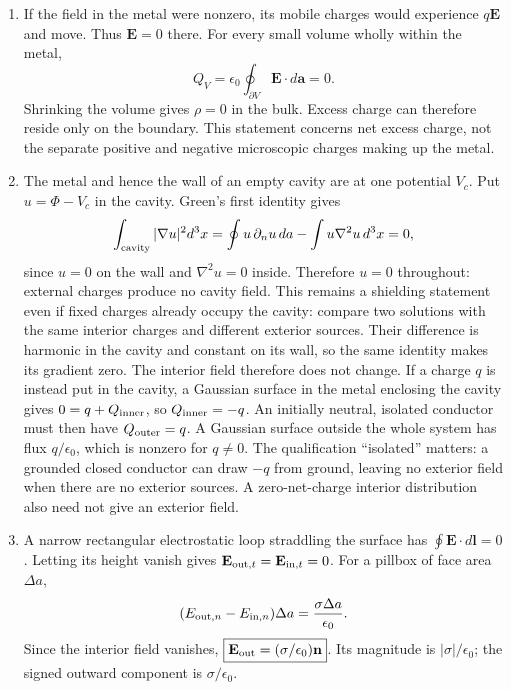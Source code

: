\begin{enumerate}
\item[(a)] If the field in the metal were nonzero, its mobile charges would
experience $q\mathbf E$ and move. Thus $\mathbf E=0$ there. For every small
volume wholly within the metal,
\[
Q_V=\epsilon_0\oint_{\partial V}\mathbf E\cdot d\mathbf a=0.
\]
Shrinking the volume gives $\rho=0$ in the bulk. Excess charge can therefore
reside only on the boundary. This statement concerns net excess charge, not
the separate positive and negative microscopic charges making up the metal.
\item[(b)] The metal and hence the wall of an empty cavity are at one
potential $V_c$. Put $u=\Phi-V_c$ in the cavity. Green's first identity gives
\[
\int_{\rm cavity}|\nabla u|^2d^3x
=\oint u\,\partial_nu\,da-\int u\nabla^2u\,d^3x=0,
\]
since $u=0$ on the wall and $\nabla^2u=0$ inside. Therefore $u=0$ throughout:
external charges produce no cavity field. This remains a shielding statement
even if fixed charges already occupy the cavity: compare two solutions with
the same interior charges and different exterior sources. Their difference
is harmonic in the cavity and constant on its wall, so the same identity
makes its gradient zero. The interior field therefore does not change.
If a charge $q$ is instead put in
the cavity, a Gaussian surface in the metal enclosing the cavity gives
$0=q+Q_{\rm inner}$, so $Q_{\rm inner}=-q$. An initially neutral, isolated
conductor must then have $Q_{\rm outer}=q$. A Gaussian surface outside the
whole system has flux $q/\epsilon_0$, which is nonzero for $q\ne0$.
The qualification ``isolated'' matters: a grounded closed conductor can draw
$-q$ from ground, leaving no exterior field when there are no exterior sources.
A zero-net-charge interior distribution also need not give an exterior field.
\item[(c)] A narrow rectangular electrostatic loop straddling the surface
has $\oint\mathbf E\cdot d\mathbf l=0$. Letting its height vanish gives
$\mathbf E_{{\rm out},t}=\mathbf E_{{\rm in},t}=0$.
For a pillbox of face area $\Delta a$,
\[
(E_{{\rm out},n}-E_{{\rm in},n})\Delta a
=\frac{\sigma\Delta a}{\epsilon_0}.
\]
Since the interior field vanishes,
$\boxed{\mathbf E_{\rm out}=(\sigma/\epsilon_0)\mathbf n}$.
Its magnitude is $|\sigma|/\epsilon_0$; the signed outward component is
$\sigma/\epsilon_0$.
\end{enumerate}


